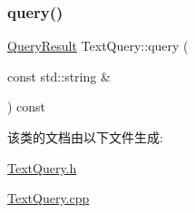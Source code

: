 \mbox{\label{classTextQuery_acdbf168c6de152095bce2ce3aaa11d1d}} 
\subsubsection{\texorpdfstring{query()}{query()}}
{\footnotesize\ttfamily \hyperlink{classQueryResult}{Query\+Result} Text\+Query\+::query (\begin{DoxyParamCaption}\item[{const std\+::string \&}]{ }\end{DoxyParamCaption}) const}



该类的文档由以下文件生成\+:\begin{DoxyCompactItemize}
\item 
\hyperlink{TextQuery_8h}{Text\+Query.\+h}\item 
\hyperlink{TextQuery_8cpp}{Text\+Query.\+cpp}\end{DoxyCompactItemize}
